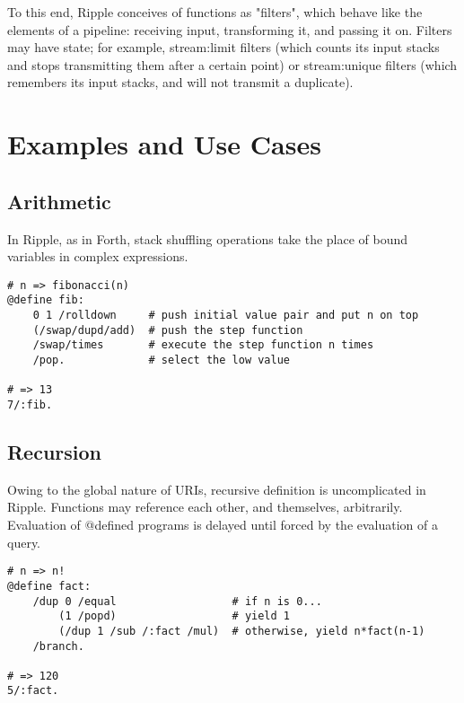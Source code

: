 \documentclass[runningheads]{llncs}
\begin{document}
To this end, Ripple conceives of functions as "filters", which behave like the elements of a pipeline: receiving input, transforming it, and passing it on.  Filters may have state; for example, stream:limit filters (which counts its input stacks and stops transmitting them after a certain point) or stream:unique filters (which remembers its input stacks, and will not transmit a duplicate).


\section{Examples and Use Cases}

\subsection{Arithmetic}
In Ripple, as in Forth, stack shuffling operations take the place of bound variables in complex expressions.
\begin{verbatim}
# n => fibonacci(n)
@define fib:
    0 1 /rolldown     # push initial value pair and put n on top
    (/swap/dupd/add)  # push the step function
    /swap/times       # execute the step function n times
    /pop.             # select the low value

# => 13
7/:fib.
\end{verbatim}


\subsection{Recursion}
Owing to the global nature of URIs, recursive definition is uncomplicated in Ripple.  Functions may reference each other, and themselves, arbitrarily.  Evaluation of @defined programs is delayed until forced by the evaluation of a query.
\begin{verbatim}
# n => n!
@define fact:
    /dup 0 /equal                  # if n is 0...
        (1 /popd)                  # yield 1
        (/dup 1 /sub /:fact /mul)  # otherwise, yield n*fact(n-1)
    /branch.

# => 120
5/:fact.
\end{verbatim}
\end{document}
